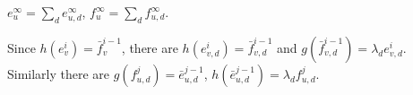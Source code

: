 \def\CTEXPreproc{Created by ctex v0.2.12, don't edit!}\documentclass[11pt]{article}
\newtheorem{prop}{Proposition}[section]
\begin{document}
    $e^{\infty} _u =\sum_{d} e^{\infty} _{u,d} $, $f^{\infty} _u =\sum_{d} f^{\infty} _{u,d}$.

     Since $h( e^i _v  ) = \bar{f}^{i-1}_v $,  there are
 $ h( e^i _{v,d}  )= \bar{f}^{i-1}_{v,d}  $ and $g( \bar{f}^{i-1}_{v,d}   )= \lambda_d e^i _{v,d}   $. Similarly there are
 $g( f^j _{u,d} )= \bar{e}^{j-1}_{u,d}  $, $h ( \bar{e}^{j-1}_{u,d}  )=\lambda_d f^{j}_{u,d}  $.














\end{document}

